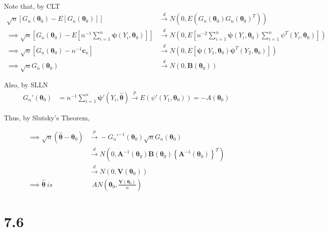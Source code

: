 \documentclass[
  letterpaper,
  DIV=11,
  numbers=noendperiod]{scrreprt}
\begin{document}
Note that, by CLT \[\begin{aligned}
\sqrt n   [G_n(\boldsymbol \theta_0)- E[G_n(\boldsymbol \theta_0)]]  &\overset d \to N(0, E(G_n(\boldsymbol \theta_0)G_n(\boldsymbol \theta_0)^T)) \\
\implies \sqrt n   \left[G_n(\boldsymbol \theta_0)- E[n^{-1} \sum_{i=1}^n \boldsymbol \psi (Y_i, \boldsymbol \theta_0)]\right]  &\overset d \to N\left(0, E\left[n^{-2} \sum_{i=1}^n \boldsymbol \psi (Y_i, \boldsymbol \theta_0)\boldsymbol \sum_{i=1}^n \psi^T (Y_i, \boldsymbol \theta_0)\right] \right) \\
\implies \sqrt n   \left[G_n(\boldsymbol \theta_0)- n^{-1} \mathbf c_n\right]  &\overset d \to N\left(0, E\left[ \boldsymbol \psi (Y_1, \boldsymbol \theta_0)\boldsymbol \psi^T (Y_2, \boldsymbol \theta_0)\right] \right) \\
\implies \sqrt n   G_n(\boldsymbol \theta_0) &\overset d \to N\left(0, \mathbf B(\boldsymbol \theta_0) \right)
\end{aligned}\]

Also, by SLLN \[\begin{aligned}
G_n'(\boldsymbol \theta_0) &=  n^{-1} \sum_{i=1}^n \boldsymbol \psi' (Y_i, \boldsymbol{\hat \theta}) \overset p \to E(\psi' (Y_1, \boldsymbol \theta_0)) = - A(\boldsymbol \theta_0)
\end{aligned}\]

Thus, by Slutsky's Theorem,

\[\begin{aligned}
\implies \sqrt n (\boldsymbol{\hat \theta} -\boldsymbol \theta_0) &\overset p \to -G_n'^{-1}(\boldsymbol \theta_0)\sqrt n   G_n(\boldsymbol \theta_0) \\
&\overset d \to N\left(0, \mathbf A^{-1}(\boldsymbol \theta_0) \mathbf B(\boldsymbol \theta_0) \left\{\mathbf A^{-1}(\boldsymbol \theta_0) \right\}^T \right) \\
&\overset d \to N\left(0, \mathbf V(\boldsymbol \theta_0) \right) \\
\implies \boldsymbol{\hat \theta} ~is ~ & ~~ AN\left( \boldsymbol \theta_0, \frac{\mathbf V(\boldsymbol \theta_0)}{n} \right)
\end{aligned}\]

\newpage

\hypertarget{section-46}{%
\section{7.6}\label{section-46}}
\end{document}
